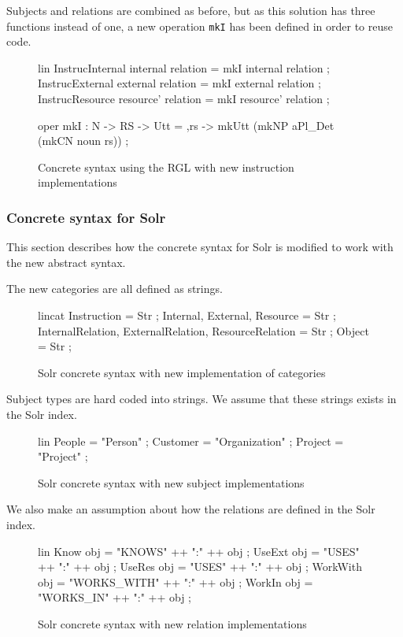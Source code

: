 Subjects and relations are combined as before, but as this solution has three functions instead of one, a new operation \texttt{mkI} has been defined in order to reuse code.

\begin{figure}[H]
\begin{code}
lin
  InstrucInternal internal relation = mkI internal relation ;
  InstrucExternal external relation = mkI external relation ;
  InstrucResource resource' relation = mkI resource' relation ;

oper
  mkI : N -> RS -> Utt = \noun,rs -> mkUtt (mkNP aPl_Det (mkCN noun rs)) ;
\end{code}
\caption{Concrete syntax using the RGL with new instruction implementations\label{fig:rgl-new-instructions}}
\end{figure}

\subsubsection*{Concrete syntax for Solr}
This section describes how the concrete syntax for Solr is modified to work with the new abstract syntax.

The new categories are all defined as strings.

\begin{figure}[H]
\begin{code}
lincat
  Instruction = Str ;
  Internal, External, Resource = Str ;
  InternalRelation, ExternalRelation, ResourceRelation = Str ;
  Object = Str ;
\end{code}
\caption{Solr concrete syntax with new implementation of categories\label{fig:solr-categories-impl}}
\end{figure}

Subject types are hard coded into strings. We assume that these strings exists in the Solr index.

\begin{figure}[H]
\begin{code}
lin
  People = "Person" ;
  Customer = "Organization" ;
  Project = "Project" ;
\end{code}
\caption{Solr concrete syntax with new subject implementations\label{fig:solr-function-implementation}}
\end{figure}

We also make an assumption about how the relations are defined in the Solr index. 

\begin{figure}[H]
\begin{code}
lin
  Know obj = "KNOWS" ++ ":" ++ obj ;
  UseExt obj = "USES" ++ ":" ++ obj ;
  UseRes obj = "USES" ++ ":" ++ obj ;
  WorkWith obj = "WORKS_WITH" ++ ":" ++ obj ;
  WorkIn obj = "WORKS_IN" ++ ":" ++ obj ;
\end{code}
\caption{Solr concrete syntax with new relation implementations\label{fig:solr-new-relations}}
\end{figure}

